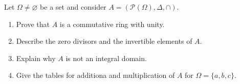 \documentclass[
    11pt,a4paper,
]{exam}
\begin{document}
\begin{questions}
\question
Let $\Omega \neq \varnothing$ be a set and consider $A = (\mathscr{P}(\Omega), \Delta, \cap)$.
\begin{enumerate}[label=(\roman*)]
\item Prove that $A$  is a commutative ring with unity.
\item Describe the zero divisors and the invertible elements of $A$.
\item Explain why $A$ is not an integral domain.
\item Give the tables for additiona and multiplication of $A$ for $\Omega = \{a,b,c\}$.
\end{enumerate}



\end{questions}
\end{document}
